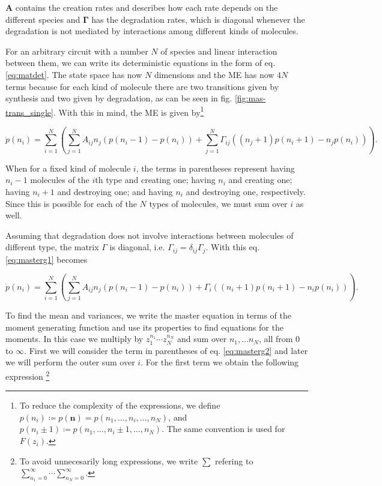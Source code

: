 $\mathbf{A}$ contains the creation rates and describes how each rate depends on the different species and $\mathbf{\Gamma}$ has the degradation rates, which is diagonal whenever the degradation is not mediated by interactions among different kinds of molecules.

For an arbitrary circuit with a number $N$ of species and linear interaction between them, we can write its deterministic equations in the form of eq. \eqref{eq:matdet}. The state space has now $N$ dimensions and the ME has now $4N$ terms because for each kind of molecule there are two transitions given by synthesis and two given by degradation, as can be seen in fig. \ref{fig:mas-trans_single}. With this in mind, the ME is given by\footnote{To reduce the complexity of the expressions, we define $p(n_i) \coloneqq p(\mathbf{n}) = p(n_1,\dotsc,n_i,\dotsc,n_N)$, and $p(n_i\pm1)\coloneqq p(n_1,\dotsc,n_i\pm1,\dotsc,n_N)$. The same convention is used for $F(z_i)$.}

\begin{equation}
  \label{eq:masterg1}
  \dot{p}(n_i) =  \sum_{i=1}^N\left(\sum_{j=1}^N A_{ij}n_j \left( p(n_i-1) - p(n_i) \right) + \sum_{j=1}^N \Gamma_{ij}\left((n_j+1)p(n_i+1)-n_jp(n_i)\right)\right).
\end{equation}

When for a fixed kind of molecule $i$, the terms in parentheses represent having $n_i-1$ molecules of the $i$th type and creating one; having $n_i$ and creating one; having $n_i+1$ and destroying one; and having $n_i$ and destroying one, respectively. Since this is possible for each of the $N$ types of molecules, we must sum over $i$ as well.

Assuming that degradation does not involve interactions between molecules of different type, the matrix $\Gamma$ is diagonal, i.e. $\Gamma_{ij}=\delta_{ij}\Gamma_j$. With this eq. \eqref{eq:masterg1} becomes

\begin{equation}
\label{eq:masterg2}
\dot{p}(n_i) =  \sum_{i=1}^N\left(\sum_{j=1}^N A_{ij}n_j \left( p(n_i-1) - p(n_i) \right) + \Gamma_{i}((n_i+1)p(n_i+1)-n_ip(n_i))\right).
\end{equation}

To find the mean and variances, we write the master equation in terms of the moment generating function and use its properties to find equations for the moments. In this case we multiply by $z_1^{n_1}\dotsm z_N^{n_N}$ and sum over $n_1,\dotsc n_N$, all from $0$ to $\infty$. First we will consider the term in parentheses of eq. \eqref{eq:masterg2} and later we will perform the outer sum over $i$. For the first term we obtain the following expression \footnote{To avoid unnecesarily long expressions, we write $\sum$ refering to $\sum_{n_1=0}^\infty\dotsi\sum_{n_N=0}^\infty$.}

